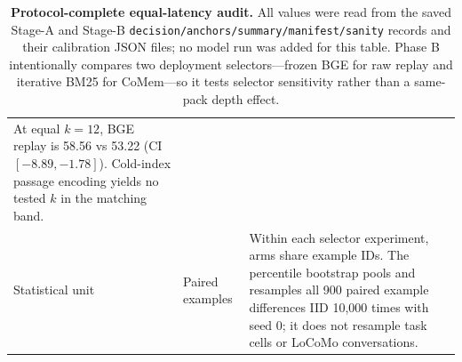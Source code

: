 \begin{table}[!tp]
\begin{tabular}{@{}p{}p{}p{}@{}}
At equal $k{=}12$, BGE replay is 58.56 vs 53.22
(CI $[-8.89,-1.78]$). Cold-index passage encoding yields no tested $k$ in the
matching band. \\
Statistical unit & Paired examples &
Within each selector experiment, arms share example IDs. The percentile
bootstrap pools and resamples all 900 paired example differences IID 10,000
times with seed 0; it does not resample task cells or LoCoMo conversations. \\
\bottomrule
\end{tabular}
\caption{\textbf{Protocol-complete equal-latency audit.}
All values were read from the saved Stage-A and Stage-B
\texttt{decision/anchors/summary/manifest/sanity} records and their calibration
JSON files; no model run was added for this table. Phase B intentionally compares
two deployment selectors---frozen BGE for raw replay and iterative BM25 for
CoMem---so it tests selector sensitivity rather than a same-pack depth effect.}
\label{tab:equal-latency-protocol}
\end{table}
